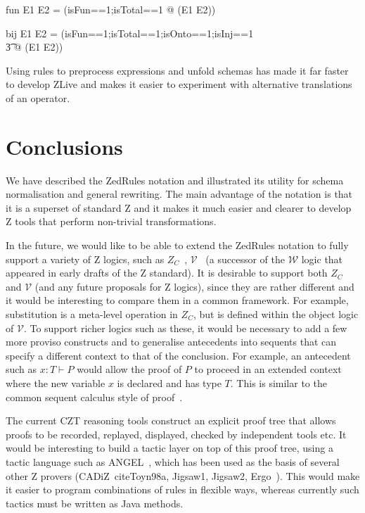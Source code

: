 \documentclass{entcs}
\newcommand{\V}{\mathcal{V}}
\newcommand{\Zc}{Z_C}
\begin{document}
\begin{zedrule}{fun}
   E1 \fun E2 = (\LET isFun==1;isTotal==1 @ \power (E1 \cross E2))
\end{zedrule}
\begin{zedrule}{bij}
   E1 \bij E2 = (\LET isFun==1;isTotal==1;isOnto==1;isInj==1 \\
   \t3               @ \power (E1 \cross E2))
\end{zedrule}

Using rules to preprocess expressions and unfold schemas has made it
far faster to develop ZLive and makes it easier to experiment with
alternative translations of an operator.


\section{Conclusions} \label{sec:concl}

We have described the ZedRules notation and illustrated its utility
for schema normalisation and general rewriting.  The main advantage
of the notation is that it is a superset of standard Z and it makes it
much easier and clearer to develop Z tools that perform non-trivial
transformations.


In the future, we would like to be able to extend the ZedRules notation to
fully support a variety of Z logics, such as
$\Zc$~\cite{henson:revising-z-1-99,henson:revising-z-2-99},
$\V$~\cite{brien:calculus-schemas-z00} (a successor of the
$\mathcal{W}$ logic that appeared in early drafts of the Z standard).  It
is desirable to support both $\Zc$ and $\V$ (and any future
proposals for Z logics), since they are rather different and it would be
interesting to compare them in a common framework.  For example,
substitution is a meta-level operation in $\Zc$, but is defined within the
object logic of $\V$.  To support richer logics such as these,
it would be necessary to add a few more proviso constructs and to
generalise antecedents into sequents that can specify a different context
to that of the conclusion.  For example, an antecedent such as $x:T \vdash
P$ would allow the proof of $P$ to proceed in an extended context where the
new variable $x$ is declared and has type $T$.  This is 
similar to the common sequent calculus style of
proof~\cite{girard:proofs-types90}. 

The current CZT reasoning tools construct an explicit proof tree that
allows proofs to be recorded, replayed, displayed, checked by independent
tools etc.
It would be interesting to build a tactic layer on top of this proof
tree, using a tactic language such as ANGEL~\cite{martin:tactics}, which
has been used as the basis of several other Z provers
(CADiZ~cite{Toyn98a}, Jigsaw1, Jigsaw2,
Ergo~\cite{martin:tac-lang-for-ergo}).
This would make it easier to program combinations of rules 
in flexible ways, whereas currently such tactics must be written as
Java methods.
\end{document}
